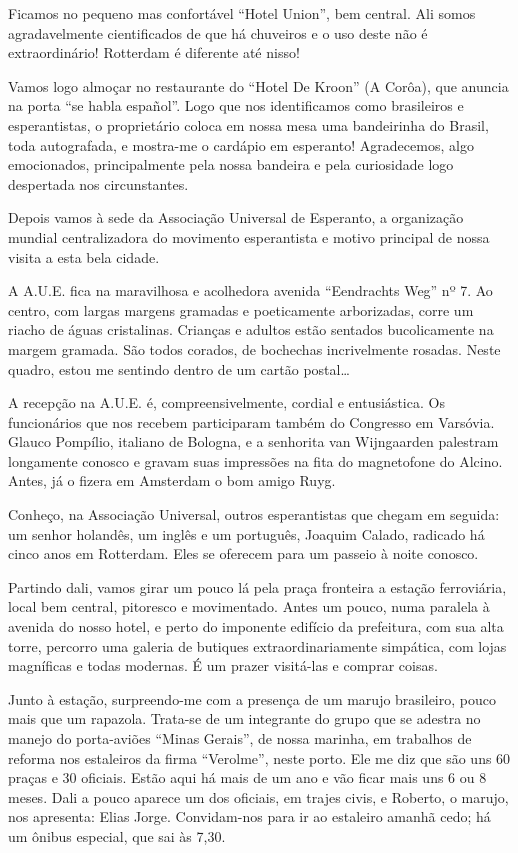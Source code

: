 Ficamos no pequeno mas confortável ``Hotel Union'', bem central. Ali somos agradavelmente cientificados de que há chuveiros e o uso deste não é extraordinário! Rotterdam é diferente até nisso!

Vamos logo almoçar no restaurante do ``Hotel De Kroon'' (A Corôa), que anuncia na porta ``se habla español''. Logo que nos identificamos como brasileiros e esperantistas, o proprietário coloca em nossa mesa uma bandeirinha do Brasil, toda autografada, e mostra-me o cardápio em esperanto! Agradecemos, algo emocionados, principalmente pela nossa bandeira e pela curiosidade logo despertada nos circunstantes.

Depois vamos à sede da Associação Universal de Esperanto, a organização mundial centralizadora do movimento esperantista e motivo principal de nossa visita a esta bela cidade.

A A.U.E. fica na maravilhosa e acolhedora avenida ``Eendrachts Weg'' nº 7. Ao centro, com largas margens gramadas e poeticamente arborizadas, corre um riacho de águas cristalinas. Crianças e adultos estão sentados bucolicamente na margem gramada. São todos corados, de bochechas incrivelmente rosadas. Neste quadro, estou me sentindo dentro de um cartão postal\ldots

A recepção na A.U.E. é, compreensivelmente, cordial e entusiástica. Os funcionários que nos recebem participaram também do Congresso em Varsóvia. Glauco Pompílio, italiano de Bologna, e a senhorita van Wijngaarden palestram longamente conosco e gravam suas impressões na fita do magnetofone do Alcino. Antes, já o fizera em Amsterdam o bom amigo Ruyg.

Conheço, na Associação Universal, outros esperantistas que chegam em seguida: um senhor holandês, um inglês e um português, Joaquim Calado, radicado há cinco anos em Rotterdam. Eles se oferecem para um passeio à noite conosco.

Partindo dali, vamos girar um pouco lá pela praça fronteira a estação ferroviária, local bem central, pitoresco e movimentado. Antes um pouco, numa paralela à avenida do nosso hotel, e perto do imponente edifício da prefeitura, com sua alta torre, percorro uma galeria de butiques extraordinariamente simpática, com lojas magníficas e todas modernas. É um prazer visitá-las e comprar coisas.

Junto à estação, surpreendo-me com a presença de um marujo brasileiro, pouco mais que um rapazola. Trata-se de um integrante do grupo que se adestra no manejo do porta-aviões ``Minas Gerais'', de nossa marinha, em trabalhos de reforma nos estaleiros da firma ``Verolme'', neste porto. Ele me diz que são uns 60 praças e 30 oficiais. Estão aqui há mais de um ano e vão ficar mais uns 6 ou 8 meses. Dali a pouco aparece um dos oficiais, em trajes civis, e Roberto, o marujo, nos apresenta: Elias Jorge. Convidam-nos para ir ao estaleiro amanhã cedo; há um ônibus especial, que sai às 7,30.

